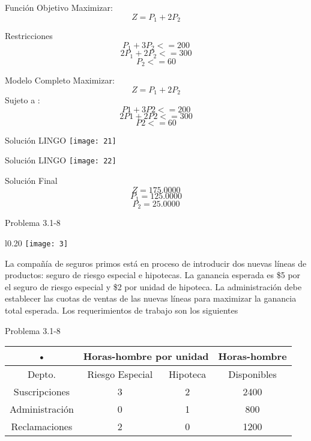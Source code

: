 \documentclass{beamer}
\begin{document}
\begin{frame}[fragile]{Funci\'on Objetivo}
Maximizar:\\
\[Z = P_{1} + 2P_{2}\]

\end{frame}

\begin{frame}[fragile]{Restricciones}
\[P_{1} + 3P_{2}  <= 200\]
\[2P_{1} + 2P_{2} <= 300\]
\[P_{2} <= 60\]
\end{frame}

\begin{frame}[fragile]{Modelo Completo}
Maximizar:\\
\[Z = P_{1} + 2P_{2}\]
Sujeto a :\\
\[P1 + 3P2  <= 200\]
\[2P1 + 2P2 <= 300\]
\[P2 <= 60\]
\end{frame}

\begin{frame}[fragile]{Soluci\'on LINGO}
    \texttt{[image: 21]}
\end{frame}
\begin{frame}[fragile]{Soluci\'on LINGO}
    \texttt{[image: 22]}
\end{frame}

\begin{frame}[fragile]{Soluci\'on Final}
\[Z = 175.0000\]
\[P_{1} = 125.0000\]
\[P_{2} = 25.0000\]
\end{frame}

\begin{frame}[t,fragile]{Problema 3.1-8 }
\begin{wrapfigure}{l}{0.20\textwidth}
    \centering
    \texttt{[image: 3]}
\end{wrapfigure} La compañ\'ia de seguros primos est\'a en proceso de introducir dos nuevas l\'ineas de productos: seguro de riesgo especial e hipotecas. La ganancia esperada es \$5 por el seguro de riesgo especial y \$2 por unidad de hipoteca.
La administraci\'on debe establecer las cuotas de ventas de las nuevas l\'ineas para maximizar la ganancia total esperada. Los requerimientos de trabajo son los siguientes\\
\end{frame}
\begin{frame}[t,fragile]{Problema 3.1-8 }

\begin{tabular}{|c|c|c|c|}
\hline 
• & \multicolumn{2}{c|}{Horas-hombre por unidad} & Horas-hombre \\ 
\hline 
Depto. & Riesgo Especial & Hipoteca & Disponibles \\ 
\hline 
Suscripciones & 3 & 2 & 2400 \\ 
\hline 
Administraci\'on & 0 & 1 & 800 \\ 
\hline 
Reclamaciones & 2 & 0 & 1200 \\ 
\hline 
\end{tabular} 
\end{frame}
\end{document}
